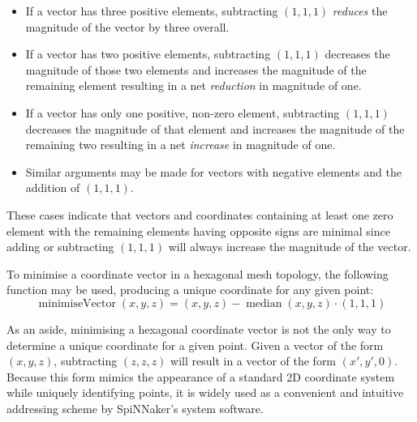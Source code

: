 	\begin{itemize}
	
		\item If a vector has three positive elements, subtracting $(1,1,1)$
		\emph{reduces} the magnitude of the vector by three overall.
		
		\item If a vector has two positive elements, subtracting $(1,1,1)$
		decreases the magnitude of those two elements and increases the magnitude
		of the remaining element resulting in a net \emph{reduction} in magnitude
		of one.
		
		\item If a vector has only one positive, non-zero element, subtracting
		$(1,1,1)$ decreases the magnitude of that element and increases the
		magnitude of the remaining two resulting in a net \emph{increase} in
		magnitude of one.
		
		\item Similar arguments may be made for vectors with negative elements and
		the addition of $(1,1,1)$.
	
	\end{itemize}
	
	These cases indicate that vectors and coordinates containing at least one
	zero element with the remaining elements having opposite signs are minimal
	since adding or subtracting $(1,1,1)$ will always increase the magnitude of
	the vector.
	
	To minimise a coordinate vector in a hexagonal mesh topology, the following
	function may be used, producing a unique coordinate for any given point:
	\begin{equation*}
		\operatorname{minimiseVector}(x,y,z) =
			(x,y,z) - \operatorname{median}(x,y,z) \cdot (1,1,1)
	\end{equation*}
	
	As an aside, minimising a hexagonal coordinate vector is not the only way to
	determine a unique coordinate for a given point. Given a vector of the form
	$(x, y, z)$, subtracting $(z,z,z)$ will result in a vector of the form $(x',
	y', 0)$. Because this form mimics the appearance of a standard 2D coordinate
	system while uniquely identifying points, it is widely used as a convenient
	and intuitive addressing scheme by SpiNNaker's system software.
